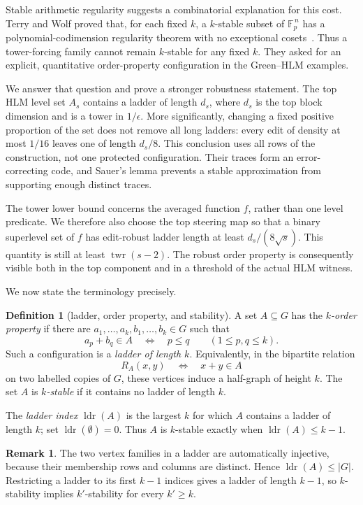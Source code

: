 \documentclass[11pt]{article}
\theoremstyle{plain}
\theoremstyle{definition}
\newtheorem{definition}[theorem]{Definition}
\newtheorem{remark}[theorem]{Remark}
\numberwithin{theorem}{section}
\newcommand{\F}{\mathbb{F}}
\newcommand{\abs}[1]{\lvert #1\rvert}
\newcommand{\twr}{\operatorname{twr}}
\newcommand{\ldr}{\operatorname{ldr}}
\begin{document}
Stable arithmetic regularity suggests a combinatorial explanation for
this cost.  Terry and Wolf proved that, for each fixed $k$, a $k$-stable
subset of $\F_p^{\,n}$ has a polynomial-codimension regularity theorem
with no exceptional cosets~\cite{TW}.  Thus a tower-forcing family cannot
remain $k$-stable for any fixed $k$.  They asked for an explicit,
quantitative order-property configuration in the Green--HLM examples.

We answer that question and prove a stronger robustness statement.  The
top HLM level set $A_s$ contains a ladder of length $d_s$, where $d_s$ is
the top block dimension and is a tower in $1/\epsilon$.  More
significantly, changing a fixed positive proportion of the set does not
remove all long ladders: every edit of density at most $1/16$ leaves one
of length $d_s/8$.  This conclusion uses all rows of the construction,
not one protected configuration.  Their traces form an error-correcting
code, and Sauer's lemma prevents a stable approximation from supporting
enough distinct traces.

The tower lower bound concerns the averaged function $f$, rather than one
level predicate.  We therefore also choose the top steering map so that a
binary superlevel set of $f$ has edit-robust ladder length at least
$d_s/(8\sqrt{s})$.  This quantity is still at least $\twr(s-2)$.  The
robust order property is consequently visible both in the top component
and in a threshold of the actual HLM witness.

We now state the terminology precisely.

\begin{definition}[ladder, order property, and stability]\label{def:op}
A set $A\subseteq G$ has the \emph{$k$-order property} if there are
$a_1,\dots,a_k,b_1,\dots,b_k\in G$ such that
\[
  a_p+b_q\in A\quad\Longleftrightarrow\quad p\le q
  \qquad(1\le p,q\le k).
\]
Such a configuration is a \emph{ladder of length $k$}.  Equivalently, in
the bipartite relation
\[
  R_A(x,y)\quad\Longleftrightarrow\quad x+y\in A
\]
on two labelled copies of $G$, these vertices induce a half-graph of
height $k$.  The set $A$ is \emph{$k$-stable} if it contains no ladder of
length $k$.

The \emph{ladder index} $\ldr(A)$ is the largest $k$ for which $A$
contains a ladder of length $k$; set $\ldr(\emptyset)=0$.  Thus $A$ is
$k$-stable exactly when $\ldr(A)\le k-1$.
\end{definition}

\begin{remark}\label{rem:ladder-bookkeeping}
The two vertex families in a ladder are automatically injective, because
their membership rows and columns are distinct.  Hence
$\ldr(A)\le\abs G$.  Restricting a ladder to its first $k-1$ indices gives
a ladder of length $k-1$, so $k$-stability implies $k'$-stability for every
$k'\ge k$.
\end{remark}
\end{document}
